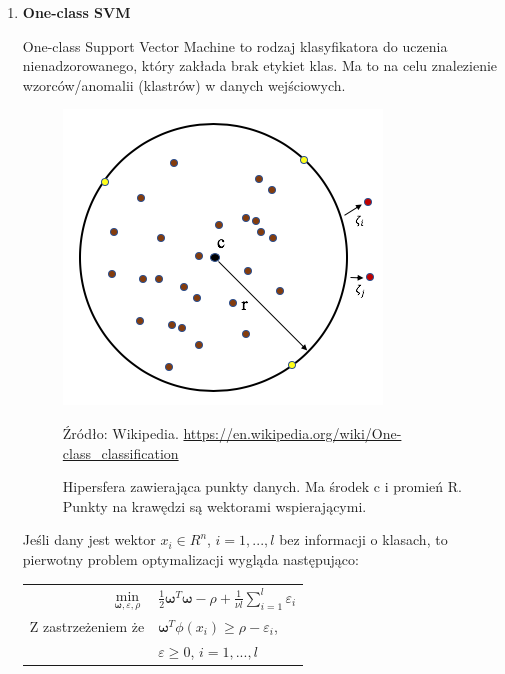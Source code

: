 \documentclass[paper=a4, fontsize=11pt]{scrartcl} %
\numberwithin{equation}{section} %
\numberwithin{figure}{section} %
\newcommand*{\captionsource}[2]{%
  \caption[{#1}]{%
      #1}
    Źródło: #2%
}
\begin{document}
\begin{enumerate}
\item \textbf{One-class SVM}
    \par One-class Support Vector Machine to rodzaj klasyfikatora do uczenia
    nienadzorowanego, który zakłada brak etykiet klas. Ma to na celu
    znalezienie wzorców/anomalii (klastrów) w danych wejściowych.  

    \begin{figure}[H]
        \begin{center}
            \includegraphics[scale=0.4]{./img/one-class-circle.png}
            \captionsource{Hipersfera zawierająca punkty danych. Ma środek c i promień R.
            Punkty na krawędzi są wektorami wspierającymi.}{Wikipedia. \url{https://en.wikipedia.org/wiki/One-class_classification}}
            \label{fig:one_class}
        \end{center}
    \end{figure}

    \par Jeśli dany jest wektor $x_i\in R^n$, $i=1,...,l$ bez informacji o klasach,
    to pierwotny problem optymalizacji wygląda następująco:

    \begin{center}
        \begin{tabular}{rl}
            $\min\limits_{\pmb{\omega},\varepsilon,\rho}$ & $\frac{1}{2}\pmb{\omega}^T\pmb{\omega} -
            \rho + \frac{1}{\nu l}\sum\limits_{i=1}^{l}\varepsilon_i$ \\
            Z zastrzeżeniem że & $\pmb{\omega}^T\phi(x_i)\geq\rho - \varepsilon_i$,\\
                               & $\varepsilon \geq 0$, $i=1,...,l$
        \end{tabular}
    \end{center}


\end{enumerate}
\end{document}
